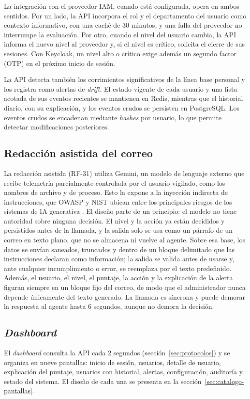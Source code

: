 La integración con el proveedor IAM, cuando está configurada, opera en ambos sentidos. Por un lado, la API incorpora el rol y el departamento del usuario como contexto informativo, con una caché de 30 minutos, y una falla del proveedor no interrumpe la evaluación. Por otro, cuando el nivel del usuario cambia, la API informa el nuevo nivel al proveedor y, si el nivel es crítico, solicita el cierre de sus sesiones. Con Keycloak, un nivel alto o crítico exige además un segundo factor (OTP) en el próximo inicio de sesión.

La API detecta también los corrimientos significativos de la línea base personal y los registra como alertas de \emph{drift}. El estado vigente de cada usuario y una lista acotada de sus eventos recientes se mantienen en Redis, mientras que el historial diario, con su explicación, y los eventos crudos se persisten en PostgreSQL. Los eventos crudos se encadenan mediante \emph{hashes} por usuario, lo que permite detectar modificaciones posteriores.

\subsection{Redacción asistida del correo}
\label{sec:prompt-injection}
La redacción asistida (RF-31) utiliza Gemini, un modelo de lenguaje externo que recibe telemetría parcialmente controlada por el usuario vigilado, como los nombres de archivo y de proceso. Esto la expone a la inyección indirecta de instrucciones, que OWASP y NIST ubican entre los principales riesgos de los sistemas de IA generativa \parencite{OWASP2025LLM, NIST_AI100_2_2025}. El diseño parte de un principio: el modelo no tiene autoridad sobre ninguna decisión. El nivel y la acción ya están decididos y persistidos antes de la llamada, y la salida solo se usa como un párrafo de un correo en texto plano, que no se almacena ni vuelve al agente. Sobre esa base, los datos se envían saneados, truncados y dentro de un bloque delimitado que las instrucciones declaran como información; la salida se valida antes de usarse y, ante cualquier incumplimiento o error, se reemplaza por el texto predefinido. Además, el usuario, el nivel, el puntaje, la acción y la explicación de la alerta figuran siempre en un bloque fijo del correo, de modo que el administrador nunca depende únicamente del texto generado. La llamada es síncrona y puede demorar la respuesta al agente hasta 6 segundos, aunque no demora la decisión.

\subsection{\emph{Dashboard}}
\label{sec:dashboard-producto}
El \emph{dashboard} consulta la API cada 2 segundos (sección~\ref{sec:protocolos}) y se organiza en nueve pantallas: inicio de sesión, usuarios, detalle de usuario, explicación del puntaje, usuarios con historial, alertas, configuración, auditoría y estado del sistema. El diseño de cada una se presenta en la sección~\ref{sec:catalogo-pantallas}.

